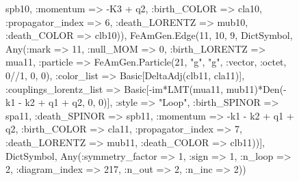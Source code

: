 \documentclass{revtex4}
\begin{document}
\begin{figure}[!htb]
\begin{center}
{spb10, :momentum => -K3 + q2, :birth_COLOR => cla10, :propagator_index => 6, :death_LORENTZ => mub10, :death_COLOR => clb10)), FeAmGen.Edge(11, 10, 9, Dict{Symbol, Any}(:mark => 11, :null_MOM => 0, :birth_LORENTZ => mua11, :particle => FeAmGen.Particle(21, "g", "g", :vector, :octet, 0//1, 0, 0), :color_list => Basic[DeltaAdj(clb11, cla11)], :couplings_lorentz_list => Basic[-im*LMT(mua11, mub11)*Den(-k1 - k2 + q1 + q2, 0, 0)], :style => "Loop", :birth_SPINOR => spa11, :death_SPINOR => spb11, :momentum => -k1 - k2 + q1 + q2, :birth_COLOR => cla11, :propagator_index => 7, :death_LORENTZ => mub11, :death_COLOR => clb11))], Dict{Symbol, Any}(:symmetry_factor => 1, :sign => 1, :n_loop => 2, :diagram_index => 217, :n_out => 2, :n_inc => 2)) 
}
\end{center}
\end{figure}
\end{document}
